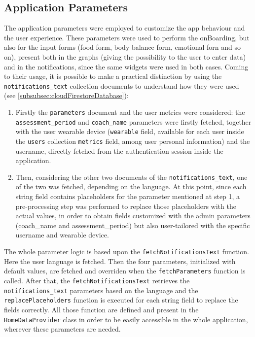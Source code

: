 \subsection{Application Parameters}
\label{subsec:applicationParameters}
The application parameters were employed to customize the app behaviour and the user experience. These parameters were used to perform the onBoarding, but also for the input forms (food form, body balance form, emotional forn and so on), present both in the graphs (giving the possibility to the user to enter data) and in the notifications, since the same widgets were used in both cases.
\newline Coming to their usage, it is possible to make a practical distinction by using the \texttt{notifications\_text} collection documents to understand how they were used (see \cref{subsubsec:cloudFirestoreDatabase}):
\begin{enumerate}[nosep] %
    \item Firstly the \texttt{parameters} document and the user metrics were considered: the \newline\texttt{assessment\_period} and \texttt{coach\_name} parameters were firstly fetched, together with the user wearable device (\texttt{wearable} field, available for each user inside the \texttt{users} collection \texttt{metrics} field, among user personal information) and the username, directly fetched from the authentication session inside the application.
    \item Then, considering the other two documents of the \texttt{notifications\_text}, one of the two was fetched, depending on the language. At this point, since each string field contains placeholders for the parameter mentioned at step 1, a pre-processing step was performed to replace those placeholders with the actual values, in order to obtain fields customized with the admin parameters (coach\_name and assessment\_period) but also user-tailored with the specific username and wearable device. 
\end{enumerate}

\noindent The whole parameter logic is based upon the \texttt{fetchNotificationsText} function. Here the user language is fetched. Then the four parameters, initialized with default values, are fetched and overriden when the \texttt{fetchParameters} function is called. After that, the \texttt{fetchNotificationsText} retrieves the \texttt{notifications\_text} parameters based on the language and the \texttt{replacePlaceholders} function is executed for each string field to replace the fields correctly. All those function are defined and present in the \texttt{HomeDataProvider} class in order to be easily accessible in the whole application, wherever these parameters are needed.

